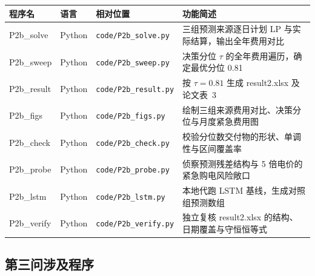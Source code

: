\documentclass[zihao=-4,a4paper,fontset=none]{ctexart}
\begin{document}
\noindent\begin{minipage}{\textwidth}
\centering
{}\label{tab:codeP2b}
{\footnotesize
\begin{tabular}{@{}p{2.4cm}p{0.9cm}p{3.7cm}p{6.4cm}@{}}
\toprule
程序名 & 语言 & 相对位置 & 功能简述 \\
\midrule
P2b\_solve & Python & \texttt{code/P2b\_solve.py} & 三组预测来源逐日计划 LP 与实际结算，输出全年费用对比 \\
P2b\_sweep & Python & \texttt{code/P2b\_sweep.py} & 决策分位 $\tau$ 的全年费用遍历，确定最优分位 0.81 \\
P2b\_result & Python & \texttt{code/P2b\_result.py} & 按 $\tau=0.81$ 生成 result2.xlsx 及论文表~3 \\
P2b\_figs & Python & \texttt{code/P2b\_figs.py} & 绘制三组来源费用对比、决策分位与月度紧急费用图 \\
P2b\_check & Python & \texttt{code/P2b\_check.py} & 校验分位数交付物的形状、单调性与区间覆盖率 \\
P2b\_probe & Python & \texttt{code/P2b\_probe.py} & 侦察预测残差结构与 5 倍电价的紧急购电风险敞口 \\
P2b\_lstm & Python & \texttt{code/P2b\_lstm.py} & 本地代跑 LSTM 基线，生成对照组预测数组 \\
P2b\_verify & Python & \texttt{code/P2b\_verify.py} & 独立复核 result2.xlsx 的结构、日期覆盖与守恒恒等式 \\
\bottomrule
\end{tabular}}
\end{minipage}

\subsection{第三问涉及程序}
\end{document}
